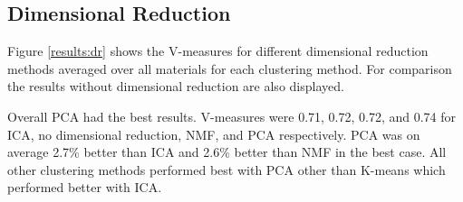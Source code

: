 \documentclass[a4paper,11pt]{article}
\begin{document}
\subsection{Dimensional Reduction} 



Figure \ref{results:dr} shows the V-measures for different dimensional reduction methods averaged over all materials for each clustering method. For comparison the results without dimensional reduction are also displayed.

Overall PCA had the best results. V-measures were 0.71, 0.72, 0.72, and 0.74 for ICA, no dimensional reduction, NMF, and PCA respectively. PCA was on average 2.7\% better than ICA and 2.6\% better than NMF in the best case. All other clustering methods performed best with PCA other than K-means which performed better with ICA.

\end{document}

